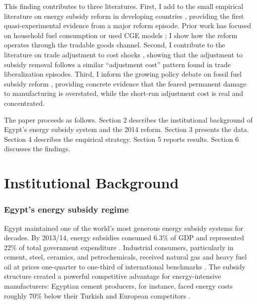 \documentclass[12pt]{article}
\begin{document}
This finding contributes to three literatures. First, I add to the small empirical literature on energy subsidy reform in developing countries \citep{allcott2014gasoline, ito2021moral, burke2015undermined}, providing the first quasi-experimental evidence from a major reform episode. Prior work has focused on household fuel consumption \citep{davis2014effect, hanna2016up} or used CGE models \citep{cockburn2018trade}; I show how the reform operates through the tradable goods channel. Second, I contribute to the literature on trade adjustment to cost shocks \citep{autor2013china, pierce2016surprisingly, dix2017trade}, showing that the adjustment to subsidy removal follows a similar ``adjustment cost'' pattern found in trade liberalization episodes. Third, I inform the growing policy debate on fossil fuel subsidy reform \citep{coady2019global, parry2021still}, providing concrete evidence that the feared permanent damage to manufacturing is overstated, while the short-run adjustment cost is real and concentrated.

The paper proceeds as follows. Section 2 describes the institutional background of Egypt's energy subsidy system and the 2014 reform. Section 3 presents the data. Section 4 describes the empirical strategy. Section 5 reports results. Section 6 discusses the findings.

\section{Institutional Background}

\subsubsection*{Egypt's energy subsidy regime} Egypt maintained one of the world's most generous energy subsidy systems for decades. By 2013/14, energy subsidies consumed 6.3\% of GDP and represented 22\% of total government expenditure \citep{imf2015egypt}. Industrial consumers, particularly in cement, steel, ceramics, and petrochemicals, received natural gas and heavy fuel oil at prices one-quarter to one-third of international benchmarks \citep{fattouh2013energy}. The subsidy structure created a powerful competitive advantage for energy-intensive manufacturers: Egyptian cement producers, for instance, faced energy costs roughly 70\% below their Turkish and European competitors \citep{worldbank2015egypt}.
\end{document}
